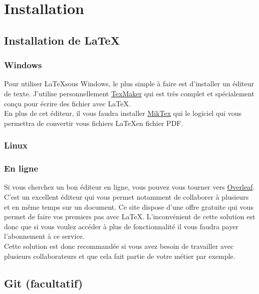 \documentclass[../main.tex]{subfiles}
\begin{document}
\chapter{Installation}

\section{Installation de \LaTeX}

\subsection{Windows}

Pour utiliser \LaTeX sous Windows, le plus simple à faire est d'installer un éditeur de texte. J'utilise personnellement \href{https://www.xm1math.net/texmaker/}{\underline{TexMaker}} qui est très complet et spécialement conçu pour écrire des fichier avec \LaTeX.\\
En plus de cet éditeur, il vous faudra installer \href{https://miktex.org/}{\underline{MikTex}} qui le logiciel qui vous permettra de convertir vous fichiers \LaTeX en fichier PDF.

\subsection{Linux}

\lipsum[2 - 4]

\subsection{En ligne}

Si vous cherchez un bon éditeur en ligne, vous pouvez vous tourner vers \href{https://fr.overleaf.com/}{\underline{Overleaf}}. C'est un excellent éditeur qui vous permet notamment de collaborer à plusieurs et en même temps sur un document. Ce site dispose d'une offre gratuite qui vous permet de faire vos premiers pas avec \LaTeX. L'inconvénient de cette solution est donc que si vous voulez accéder à plus de fonctionnalité il vous faudra payer l'abonnement à ce service.\\
Cette solution est donc recommandée si vous avez besoin de travailler avec plusieurs collaborateurs et que cela fait partie de votre métier par exemple.

\section{Git (facultatif)}
\end{document}
